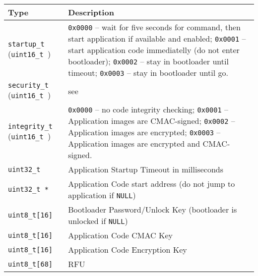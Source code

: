 \begin{table*}[!ht]
  \hspace*{-4cm}
  \begin{tabular}{| p{4cm} | p{9cm} | }
      \hline
      \rowcolor{SeaGreen3!30!} {\bf Type} & {\bf Description} \\
      \hline
      \hline
      {\tt startup\_t } \newline ({\tt uint16\_t })  & {\tt 0x0000} -- wait for five seconds for command, then start application if available and enabled;\newline
                          {\tt 0x0001} -- start application code immediatelly (do not enter bootloader);\newline
                          {\tt 0x0002} -- stay in bootloader until timeout;\newline 
                          {\tt 0x0003} -- stay in bootloader until go.\\
      \hline
      {\tt security\_t } \newline ({\tt uint16\_t }) & see \nameref{sec:security:secModes}\\
      \hline
      {\tt integrity\_t } \newline ({\tt uint16\_t }) & {\tt 0x0000} -- no code integrity checking;\newline
                          {\tt 0x0001} -- Application images are CMAC-signed;\newline
                          {\tt 0x0002} -- Application images are encrypted;\newline 
                          {\tt 0x0003} -- Application images are encrypted and CMAC-signed.\\
      \hline
      {\tt uint32\_t}    & Application Startup Timeout in milliseconds \\
      \hline
      {\tt uint32\_t *}  & Application Code start address\newline
                           (do not jump to application if {\tt NULL}) \\
      \hline
      {\tt uint8\_t[16]} & Bootloader Password/Unlock Key\newline
                           (bootloader is unlocked if {\tt NULL}) \\
      \hline
      {\tt uint8\_t[16]} & Application Code CMAC Key \\
      \hline
      {\tt uint8\_t[16]} & Application Code Encryption Key \\
      \hline
      {\tt uint8\_t[68]} & RFU \\
      \hline
  \end{tabular}
  \label{tab:cfgStruct}
 \end{table*}
 

